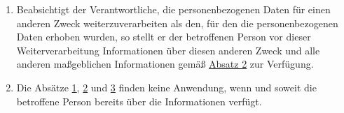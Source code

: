 \begin{enumerate}
\begin{enumerate}
  \end{enumerate}

  \item Beabsichtigt der Verantwortliche, die personenbezogenen Daten für einen anderen Zweck weiterzuverarbeiten als
   den, für den die personenbezogenen Daten erhoben wurden, so stellt er der betroffenen Person vor dieser
   Weiterverarbeitung Informationen über diesen anderen Zweck und alle anderen maßgeblichen Informationen gemäß
   \hyperref[itm:13-2]{Absatz 2} zur Verfügung.
  \label{itm:13-3}  

  \item Die Absätze \hyperref[itm:13-1]{1}, \hyperref[itm:13-2]{2} und \hyperref[itm:13-3]{3} finden keine Anwendung,
   wenn und soweit die betroffene Person bereits über die Informationen verfügt.
  \label{itm:13-4}  

\end{enumerate}



